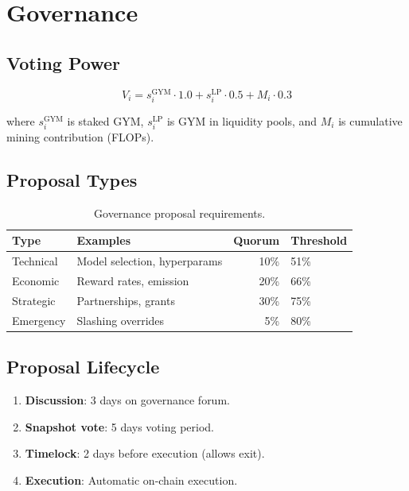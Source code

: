 \documentclass[11pt,letterpaper]{article}
\begin{document}
\section{Governance}
\label{sec:governance}

\subsection{Voting Power}

\begin{equation}
    V_i = s_i^{\text{GYM}} \cdot 1.0 + s_i^{\text{LP}} \cdot 0.5 + M_i \cdot 0.3
\end{equation}

where $s_i^{\text{GYM}}$ is staked GYM, $s_i^{\text{LP}}$ is GYM in liquidity pools, and $M_i$ is cumulative mining contribution (FLOPs).

\subsection{Proposal Types}

\begin{table}[t]
\centering
\begin{tabular}{llrl}
\toprule
\textbf{Type} & \textbf{Examples} & \textbf{Quorum} & \textbf{Threshold} \\
\midrule
Technical & Model selection, hyperparams & 10\% & 51\% \\
Economic & Reward rates, emission & 20\% & 66\% \\
Strategic & Partnerships, grants & 30\% & 75\% \\
Emergency & Slashing overrides & 5\% & 80\% \\
\bottomrule
\end{tabular}
\caption{Governance proposal requirements.}
\label{tab:governance}
\end{table}

\subsection{Proposal Lifecycle}

\begin{enumerate}
    \item \textbf{Discussion}: 3 days on governance forum.
    \item \textbf{Snapshot vote}: 5 days voting period.
    \item \textbf{Timelock}: 2 days before execution (allows exit).
    \item \textbf{Execution}: Automatic on-chain execution.
\end{enumerate}
\end{document}

